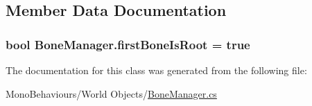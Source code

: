 \subsection{Member Data Documentation}
\subsubsection[{\texorpdfstring{first\+Bone\+Is\+Root}{firstBoneIsRoot}}]{\setlength{\rightskip}{0pt plus 5cm}bool Bone\+Manager.\+first\+Bone\+Is\+Root = true}\hypertarget{class_bone_manager_af2e926ad873f1c61b51fda9b219c78eb}{}\label{class_bone_manager_af2e926ad873f1c61b51fda9b219c78eb}


The documentation for this class was generated from the following file\+:\begin{DoxyCompactItemize}
\item 
Mono\+Behaviours/\+World Objects/\hyperlink{_bone_manager_8cs}{Bone\+Manager.\+cs}\end{DoxyCompactItemize}
